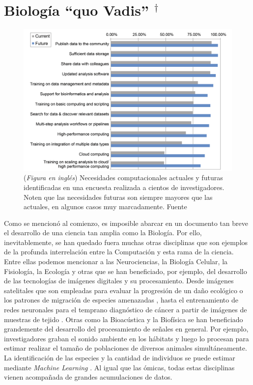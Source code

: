\section{Biología ``quo Vadis'' \texorpdfstring{$^\dagger$}{}}
 
\let\thefootnote\relax{}
\begin{figure}[tb]
  \centering
  \includegraphics[width=0.8\columnwidth]{images/survey.png}
  \caption{
      (\textit{Figura en inglés})
      Necesidades computacionales actuales y futuras identificadas en una encuesta realizada a cientos de investigadores.
      Noten que las necesidades futuras son siempre mayores que las actuales, en algunos casos muy marcadamente.
      Fuente \cite{baroneUnmetNeedsAnalyzing2017}}
  \label{fig:survey}
\end{figure}
 
Como se mencionó al comienzo, es imposible abarcar en un documento tan breve el desarrollo de una ciencia tan amplia como la Biología.
Por ello, inevitablemente, se han quedado fuera muchas otras disciplinas que son ejemplos de la profunda interrelación entre la Computación y esta rama de la ciencia.
Entre ellas podemos mencionar a las Neurociencias, la Biología Celular, la Fisiología, la Ecología y otras que se han beneficiado, por ejemplo, del desarrollo de las tecnologías de imágenes digitales y su procesamiento.
Desde imágenes satelitales que son empleadas para evaluar la progresión de un daño ecológico o los patrones de migración de especies amenazadas \cite{kwokEcologyRemotesensingRevolution2018}, hasta el entrenamiento de redes neuronales para el temprano diagnóstico de cáncer a partir de imágenes de muestras de tejido \cite{mohammadzadehAdvancesOptimalDetection2015}.
Otras como la Bioacústica y la Biofísica se han beneficiado grandemente del desarrollo del procesamiento de señales en general.
Por ejemplo, investigadores graban el sonido ambiente en los hábitats y luego lo procesan para estimar realizar el tamaño de poblaciones de diversos animales simultáneamente.
La identificación de las especies y la cantidad de individuos se puede estimar mediante \textit{Machine Learning} \cite{kahlBirdNETDeepLearning2021}.
Al igual que las ómicas, todas estas disciplinas vienen acompañada de grandes acumulaciones de datos.
 
